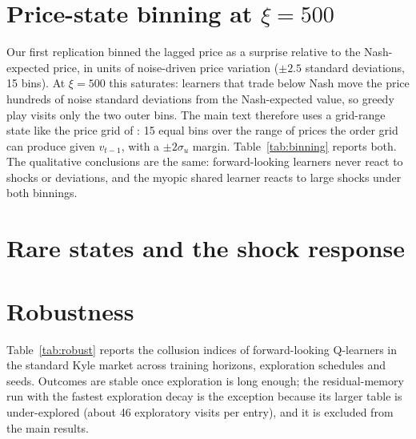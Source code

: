 \section{Price-state binning at $\xi=500$}
\label{app:binning}

Our first replication binned the lagged price as a surprise relative to the
Nash-expected price, in units of noise-driven price variation ($\pm2.5$
standard deviations, 15 bins). At $\xi=500$ this saturates: learners that
trade below Nash move the price hundreds of noise standard deviations from the
Nash-expected value, so greedy play visits only the two outer bins. The main
text therefore uses a grid-range state like the price grid of \citet{dou2025}:
15 equal bins over the range of prices the order grid can produce given
$v_{t-1}$, with a $\pm2\sigma_u$ margin. Table~\ref{tab:binning} reports both.
The qualitative conclusions are the same: forward-looking learners never react
to shocks or deviations, and the myopic shared learner reacts to large shocks
under both binnings.

\begin{table}[h]
  \centering
  \small
  \resizebox{\linewidth}{!}{}
  \caption{$\xi=500$ results under the two price-state binnings. Shock
  response and rival reaction in \% of $\beta^N$; 95\% CIs.}
  \label{tab:binning}
\end{table}

\section{Rare states and the shock response}
\label{app:rare}


\section{Robustness}
\label{app:robust}

Table~\ref{tab:robust} reports the collusion indices of forward-looking
Q-learners in the standard Kyle market across training horizons, exploration
schedules and seeds. Outcomes are stable once exploration is long enough; the
residual-memory run with the fastest exploration decay is the exception
because its larger table is under-explored (about 46 exploratory visits per
entry), and it is excluded from the main results.

\begin{table}[h]
  \centering
  \small
  
  \caption{Robustness of the standard-Kyle outcomes. $\beta$ is the exploration
  decay ($\varepsilon_t=e^{-\beta t}$). 100--200 markets per row; 95\% CIs.}
  \label{tab:robust}
\end{table}

